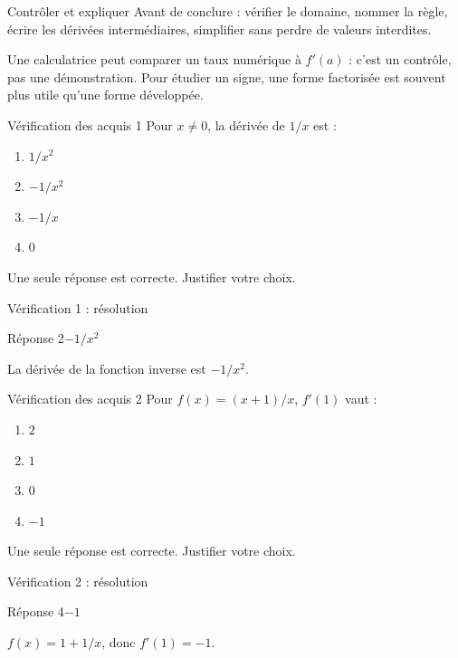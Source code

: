 \documentclass[aspectratio=169,12pt]{beamer}
\begin{document}
\begin{frame}[t,fragile]{Contrôler et expliquer}
Avant de conclure : vérifier le domaine, nommer la règle, écrire les dérivées intermédiaires, simplifier sans perdre de valeurs interdites.\medskip\par Une calculatrice peut comparer un taux numérique à $f\prime(a)$ : c’est un contrôle, pas une démonstration. Pour étudier un signe, une forme factorisée est souvent plus utile qu’une forme développée.
\end{frame}
\renewcommand{\slidekind}{À VOUS DE JOUER}\begin{frame}[t]{Vérification des acquis 1}
Pour $x\ne0$, la dérivée de $1/x$ est :\begin{enumerate}
\item $1/x^2$
\item $-1/x^2$
\item $-1/x$
\item $0$
\end{enumerate}\medskip Une seule réponse est correcte. Justifier votre choix.\end{frame}
\renewcommand{\slidekind}{COMPRENDRE LA RÉPONSE}\begin{frame}[t]{Vérification 1 : résolution}
\begin{block}{Réponse 2}$-1/x^2$\end{block}\medskip La dérivée de la fonction inverse est $-1/x^2$.\end{frame}
\renewcommand{\slidekind}{À VOUS DE JOUER}\begin{frame}[t]{Vérification des acquis 2}
Pour $f(x)=(x+1)/x$, $f\prime(1)$ vaut :\begin{enumerate}
\item $2$
\item $1$
\item $0$
\item $-1$
\end{enumerate}\medskip Une seule réponse est correcte. Justifier votre choix.\end{frame}
\renewcommand{\slidekind}{COMPRENDRE LA RÉPONSE}\begin{frame}[t]{Vérification 2 : résolution}
\begin{block}{Réponse 4}$-1$\end{block}\medskip $f(x)=1+1/x$, donc $f\prime(1)=-1$.\end{frame}
\end{document}
